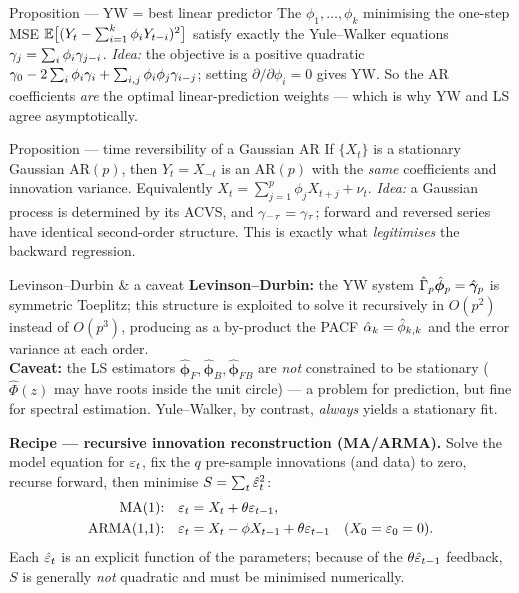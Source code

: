 \documentclass[11pt]{article}
\begin{document}
\begin{result}{Proposition --- YW = best linear predictor}
The $\phi_1,\dots,\phi_k$ minimising the one-step MSE $\mathbb{E}\big[(Y_t-\sum_{i=1}^k\phi_iY_{t-i})^2\big]$ satisfy exactly the Yule--Walker equations $\gamma_j=\sum_i\phi_i\gamma_{j-i}$.
\textit{Idea:} the objective is a positive quadratic $\gamma_0-2\sum_i\phi_i\gamma_i+\sum_{i,j}\phi_i\phi_j\gamma_{i-j}$; setting $\partial/\partial\phi_i=0$ gives YW. So the AR coefficients \emph{are} the optimal linear-prediction weights --- which is why YW and LS agree asymptotically.
\end{result}

\begin{result}{Proposition --- time reversibility of a Gaussian AR}
If $\{X_t\}$ is a stationary Gaussian AR$(p)$, then $Y_t=X_{-t}$ is an AR$(p)$ with the \emph{same} coefficients and innovation variance. Equivalently $X_t=\sum_{j=1}^p\phi_jX_{t+j}+\nu_t$.
\textit{Idea:} a Gaussian process is determined by its ACVS, and $\gamma_{-\tau}=\gamma_\tau$; forward and reversed series have identical second-order structure. This is exactly what \emph{legitimises} the backward regression.
\end{result}

\begin{result}{Levinson--Durbin \& a caveat}
\textbf{Levinson--Durbin:} the YW system $\hat\Gamma_p\hat{\bm\phi}_p=\hat{\bm{\gamma}}_p$ is symmetric Toeplitz; this structure is exploited to solve it recursively in $O(p^2)$ instead of $O(p^3)$, producing as a by-product the PACF $\hat{\alpha}_k=\hat\phi_{k,k}$ and the error variance at each order.\\
\textbf{Caveat:} the LS estimators $\hat{\bm\phi}_F,\hat{\bm\phi}_B,\hat{\bm\phi}_{FB}$ are \emph{not} constrained to be stationary ($\hat\Phi(z)$ may have roots inside the unit circle) --- a problem for prediction, but fine for spectral estimation. Yule--Walker, by contrast, \emph{always} yields a stationary fit.
\end{result}

\textbf{Recipe --- recursive innovation reconstruction (MA/ARMA).} Solve the model equation for $\varepsilon_t$, fix the $q$ pre-sample innovations (and data) to zero, recurse forward, then minimise $S=\sum_t\hat{\varepsilon}_t^2$:
\[
\begin{aligned}
\text{MA(1):}\quad &\varepsilon_t=X_t+\theta\varepsilon_{t-1},\\
\text{ARMA(1,1):}\quad &\varepsilon_t=X_t-\phi X_{t-1}+\theta\varepsilon_{t-1}\quad(X_0=\varepsilon_0=0).
\end{aligned}
\]
Each $\hat{\varepsilon}_t$ is an explicit function of the parameters; because of the $\theta\hat{\varepsilon}_{t-1}$ feedback, $S$ is generally \emph{not} quadratic and must be minimised numerically.
\end{document}
